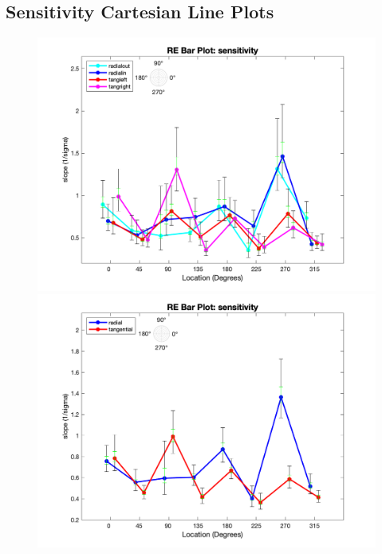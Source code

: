\documentclass[11pt]{article} %
\begin{document}
\newpage
\subsection{Sensitivity Cartesian Line Plots}
\begin{figure}[H]
\centering %
\includegraphics[scale=.3]{Images/RE_LP_sensitivity_Alldata_4conds.png}
\includegraphics[scale=.3]{Images/RE_LP_sensitivity_Alldata_2conds.png}
\end{figure}
\end{document}
